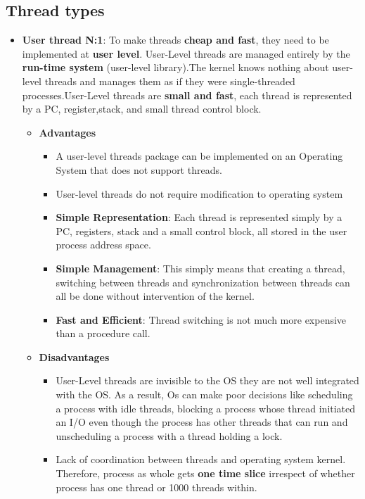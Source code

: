 \documentclass{article}
\begin{document}
\subsection{Thread types}
\begin{flushleft}
\begin{itemize}
	\item \textbf{User thread N:1}: To make threads \textbf{cheap and fast}, they need to be implemented at \textbf{user level}. User-Level threads are managed entirely by the \textbf{run-time system} (user-level library).The kernel knows nothing about user-level threads and manages them as if they were single-threaded processes.User-Level threads are \textbf{small and fast}, each thread is represented by a PC, register,stack, and small thread control block.
	\begin{itemize}
		\item \textbf{Advantages}
		\begin{itemize}
			\item A user-level threads package can be implemented on an Operating System that does not support threads.
			\item User-level threads do not require modification to operating system
			\item \textbf{Simple Representation}: Each thread is represented simply by a PC, registers, stack and a small control block, all stored in the user process address space.
			\item \textbf{Simple Management}: This simply means that creating a thread, switching between threads and synchronization between threads can all be done without intervention of the kernel.
			\item \textbf{Fast and Efficient}:  Thread switching is not much more expensive than a procedure call.
		\end{itemize}
		\item \textbf{Disadvantages}
		\begin{itemize}
			\item User-Level threads are invisible to the OS they are not well integrated with the OS. As a result, Os can make poor decisions like scheduling a process with idle threads, blocking a process whose thread initiated an I/O even though the process has other threads that can run and unscheduling a process with a thread holding a lock.
			\item Lack of coordination between threads and operating system kernel. Therefore, process as whole gets \textbf{one time slice} irrespect of whether process has one thread or 1000 threads within.

\end{itemize}
\end{itemize}
\end{itemize}
\end{flushleft}
\end{document}
